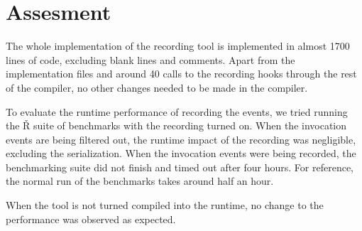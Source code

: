 \section{Assesment}

The whole implementation of the recording tool is implemented in almost 1700 lines of code, excluding blank lines and comments. Apart from the implementation files and around 40 calls to the recording hooks through the rest of the compiler, no other changes needed to be made in the compiler.

To evaluate the runtime performance of recording the events, we tried running the Ř suite of benchmarks with the recording turned on. When the invocation events are being filtered out, the runtime impact of the recording was negligible, excluding the serialization. When the invocation events were being recorded, the benchmarking suite did not finish and timed out after four hours. For reference, the normal run of the benchmarks takes around half an hour.

When the tool is not turned compiled into the runtime, no change to the performance was observed as expected.


